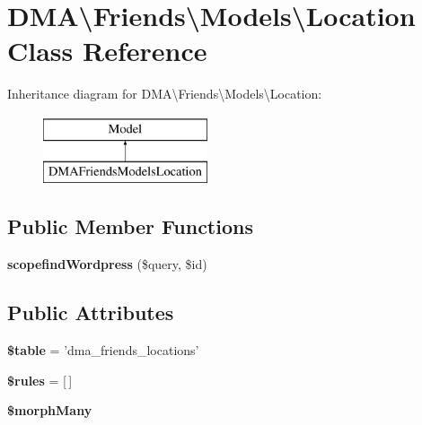 \hypertarget{classDMA_1_1Friends_1_1Models_1_1Location}{\section{D\+M\+A\textbackslash{}Friends\textbackslash{}Models\textbackslash{}Location Class Reference}
\label{classDMA_1_1Friends_1_1Models_1_1Location}
}
Inheritance diagram for D\+M\+A\textbackslash{}Friends\textbackslash{}Models\textbackslash{}Location\+:\begin{figure}[H]
\begin{center}
\leavevmode
\includegraphics[height=2.000000cm]{d6/df9/classDMA_1_1Friends_1_1Models_1_1Location}
\end{center}
\end{figure}
\subsection*{Public Member Functions}
\begin{DoxyCompactItemize}
\item 
\hypertarget{classDMA_1_1Friends_1_1Models_1_1Location_ad8b1171d787276f812889f20a6916e15}{{\bfseries scopefind\+Wordpress} (\$query, \$id)}\label{classDMA_1_1Friends_1_1Models_1_1Location_ad8b1171d787276f812889f20a6916e15}

\end{DoxyCompactItemize}
\subsection*{Public Attributes}
\begin{DoxyCompactItemize}
\item 
\hypertarget{classDMA_1_1Friends_1_1Models_1_1Location_ac1f41b316e50581d95f80655e36b7f9d}{{\bfseries \$table} = 'dma\+\_\+friends\+\_\+locations'}\label{classDMA_1_1Friends_1_1Models_1_1Location_ac1f41b316e50581d95f80655e36b7f9d}

\item 
\hypertarget{classDMA_1_1Friends_1_1Models_1_1Location_a3df0019a82eb74c240408878329baa2c}{{\bfseries \$rules} = \mbox{[}$\,$\mbox{]}}\label{classDMA_1_1Friends_1_1Models_1_1Location_a3df0019a82eb74c240408878329baa2c}

\item 
{\bfseries \$morph\+Many}
\end{DoxyCompactItemize}
